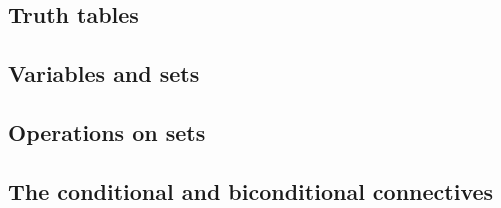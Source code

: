 \documentclass[../setup.tex]{subfiles}
\begin{document}
\subsection{Truth tables}
\subsection{Variables and sets}
\subsection{Operations on sets}
\subsection{The conditional and biconditional connectives}
\end{document}
